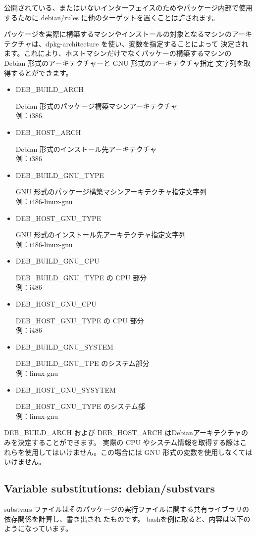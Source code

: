 \documentclass[mingoth,a4paper]{jsarticle}
\begin{document}
 公開されている、またはいないインターフェイスのためやパッケージ内部で使用するために debian/rules に他のターゲットを置くことは許されます。

 パッケージを実際に構築するマシンやインストールの対象となるマシンのアーキテクチャは、dpkg-architecture を使い、変数を指定することによって
決定されます。これにより、ホストマシンだけでなくパッケーの構築するマシンの Debian 形式のアーキテクチャーと GNU 形式のアーキテクチャ指定
文字列を取得するとができます。
\begin{itemize}
\item DEB\_BUILD\_ARCH

	Debian 形式のパッケージ構築マシンアーキテクチャ\\
	例：i386
\item DEB\_HOST\_ARCH

	Debian 形式のインストール先アーキテクチャ\\
	例：i386
\item DEB\_BUILD\_GNU\_TYPE
	
	GNU 形式のパッケージ構築マシンアーキテクチャ指定文字列\\
	例：i486-linux-gnu
\item DEB\_HOST\_GNU\_TYPE

	GNU 形式のインストール先アーキテクチャ指定文字列\\
	例：i486-linux-gnu
\item DEB\_BUILD\_GNU\_CPU

	DEB\_BUILD\_GNU\_TYPE の CPU 部分\\
	例：i486
\item DEB\_HOST\_GNU\_CPU

	DEB\_HOST\_GNU\_TYPE の CPU 部分\\
	例：i486
\item DEB\_BUILD\_GNU\_SYSTEM

	DEB\_BUILD\_GNU\_TPE のシステム部分\\
	例：linux-gnu
\item DEB\_HOST\_GNU\_SYSYTEM

	DEB\_HOST\_GNU\_TYPE のシステム部\\
	例：linux-gnu	
\end{itemize}

DEB\_BUILD\_ARCH および DEB\_HOST\_ARCH はDebianアーキテクチャのみを決定することができます。
実際の CPU やシステム情報を取得する際はこれらを使用してはいけません。この場合には GNU 形式の変数を使用しなくてはいけません。 

\subsection{Variable substitutions: debian/substvars}
	substvars ファイルはそのパッケージの実行ファイルに関する共有ライブラリの依存関係を計算し、書き出され
	たものです。
	bashを例に取ると、内容は以下のようになっています。
\end{document}
